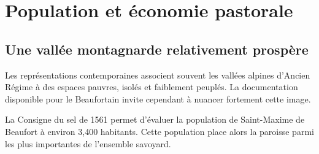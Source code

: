 \documentclass[12pt,a4paper]{report}
\begin{document}
\section{Population et économie pastorale}

\subsection{Une vallée montagnarde relativement prospère}

Les représentations contemporaines associent souvent les vallées alpines d'Ancien Régime à des espaces pauvres, isolés et faiblement peuplés. La documentation disponible pour le Beaufortain invite cependant à nuancer fortement cette image.

La Consigne du sel de 1561 permet d'évaluer la population de Saint-Maxime de Beaufort à environ 3,400 habitants. Cette population place alors la paroisse parmi les plus importantes de l'ensemble savoyard. 
\end{document}
